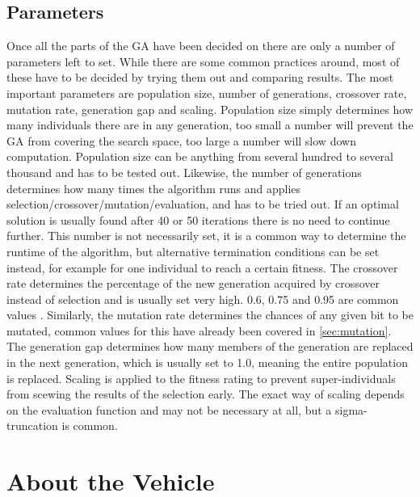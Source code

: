 \subsection{Parameters}
\label{sec:parameters}

Once all the parts of the GA have been decided on there are only a number of parameters left to set. While there are some common practices around, most of these have to be decided by trying them out and comparing results. The most important parameters are population size, number of generations, crossover rate, mutation rate, generation gap and scaling. Population size simply determines how many individuals there are in any generation, too small a number will prevent the GA from covering the search space, too large a number will slow down computation. Population size can be anything from several hundred to several thousand and has to be tested out. Likewise, the number of generations determines how many times the algorithm runs and applies selection/crossover/mutation/evaluation, and has to be tried out. If an optimal solution is usually found after 40 or 50 iterations there is no need to continue further. This number is not necessarily set, it is a common way to determine the runtime of the algorithm, but alternative termination conditions can be set instead, for example for one individual to reach a certain fitness. The crossover rate determines the percentage of the new generation acquired by crossover instead of selection and is usually set very high. 0.6, 0.75 and 0.95 are common values \cite{20, 22,24}. Similarly, the mutation rate determines the chances of any given bit to be mutated, common values for this have already been covered in \ref{sec:mutation}. The generation gap determines how many members of the generation are replaced in the next generation, which is usually set to 1.0, meaning the entire population is replaced. Scaling is applied to the fitness rating to prevent super-individuals from scewing the results of the selection early. The exact way of scaling depends on the evaluation function and may not be necessary at all, but a sigma-truncation is common. \cite{26}

\section{About the Vehicle}
\label{sec:previous_knowledge_vehicle}

